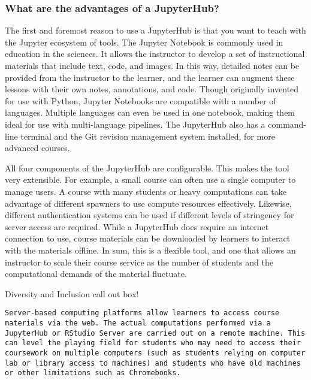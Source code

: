 \subsubsection{What are the advantages of a JupyterHub?}

The first and foremost reason to use a JupyterHub is that you want to teach with the Jupyter ecosystem of tools.
The Jupyter Notebook is commonly used in education in the sciences.
It allows the instructor to develop a set of instructional materials that include text, code, and images.
In this way, detailed notes can be provided from the instructor to the learner, and the learner can augment these lessons with their own notes, annotations, and code.
Though originally invented for use with Python, Jupyter Notebooks are compatible with a number of languages.
Multiple languages can even be used in one notebook, making them ideal for use with multi-language pipelines.
The JupyterHub also has a command-line terminal and the Git revision management system installed, for more advanced courses.

All four components of the JupyterHub are configurable.
This makes the tool very extensible. 
For example, a small course can often use a single computer to manage users.
A course with many students or heavy computations can take advantage of different spawners to use compute resources effectively.
Likewise, different authentication systems can be used if different levels of stringency for server access are required.
While a JupyterHub does require an internet connection to use, course materials can be downloaded by learners to interact with the materials offline. 
In sum, this is a flexible tool, and one that allows an instructor to scale their course service as the number of students and the computational demands of the material fluctuate. 


{\begin{framed}
Diversity and Inclusion call out box! 
\begin{snugshade*}
\begin{lstlisting}
Server-based computing platforms allow learners to access course materials via the web. The actual computations performed via a JupyterHub or RStudio Server are carried out on a remote machine. This can level the playing field for students who may need to access their coursework on multiple computers (such as students relying on computer lab or library access to machines) and students who have old machines or other limitations such as Chromebooks.
\end{lstlisting}
\end{snugshade*}
\end{framed}}

